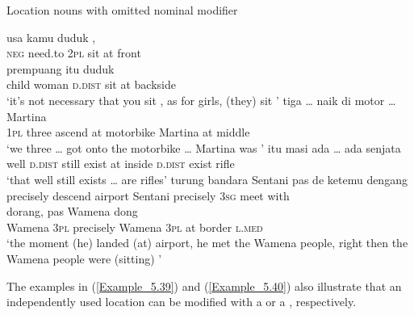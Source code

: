 \begin{styleExampleTitle}
Location nouns with omitted nominal modifier
\end{styleExampleTitle}
\ea
\label{Example_5.37}
 {{usa}} {{kamu}} {{duduk}} {} {{,}}\\ %
 \textsc{neg}  {need.to}  {\textsc{2pl}}  {sit}  at  {front}\\
  {prempuang}  {itu}  {duduk}    \\
 {child}  {woman}  {\textsc{d.dist}}  {sit}  at  backside\\
\glt 
‘it’s not necessary that you sit , as for girls, (they) sit ’ \textstyleExampleSource{[081115-001a-Cv.0316]}
\z
\ea
\label{Example_5.38}
 {tiga} {\ldots} {naik} {di} {motor} {\ldots} {Martina} {} {}\\ %
 \textsc{1pl}  three  { }  ascend  at  motorbike  {}  Martina  at  middle\\
\glt 
‘we three {\ldots} got onto the motorbike {\ldots} Martina was ’ \textstyleExampleSource{[081015-005-NP.0020]}
\z
\ea
\label{Example_5.39}
 {itu} {masi} {ada} {{\ldots}} {} {} {} {ada} {senjata}\\ %
 well  \textsc{d.dist}  still  exist { }   at  inside  \textsc{d.dist}  exist  rifle\\
\glt 
‘that well still exists {\ldots}  are rifles’ \textstyleExampleSource{[080922-010a-CvNF.0120-0121]}
\z
\ea
\label{Example_5.40}
 {{turung}} {{bandara}} {{Sentani}} {{pas}} {{de}} {{ketemu}} {dengang}\\ %
 {precisely}  {descend}  {airport}  {Sentani}  {precisely}  {\textsc{3sg}}  {meet}  with\\
  {dorang,}  {pas}  {Wamena}  dong  {}  {}  {}\\
 {Wamena}  {\textsc{3pl}}  {precisely}  {Wamena}  \textsc{3pl}  {at}  {border}  {\textsc{l.med}}\\
\glt 
‘the moment (he) landed (at)  airport, he met the Wamena people, right then the Wamena people were (sitting)  ’ \textstyleExampleSource{[081109-009-JR.0003]}
\z


The examples in (\ref{Example_5.39}) and (\ref{Example_5.40}) also illustrate that an independently used location  can be modified with a  or a , respectively.



